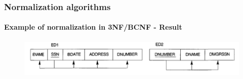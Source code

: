 \documentclass{beamer}
\begin{document}
\begin{frame}
	\frametitle{Normalization algorithms}
	\framesubtitle{Example of normalization in 3NF/BCNF - Result}
	
	\begin{figure}
		\includegraphics[scale=0.4]{img/normalization/norm18}
	\end{figure}
\end{frame}
\end{document}
